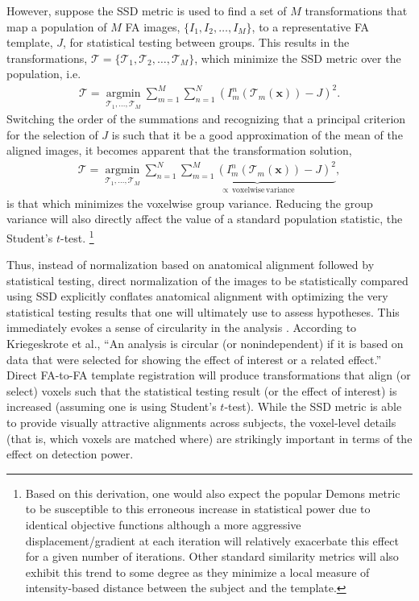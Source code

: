 \documentclass[final,5p,times,twocolumn]{elsarticle}
\begin{document}
However, suppose the SSD metric is used to find a set of $M$ transformations that map a population of $M$ FA images, $\{I_1, I_2, \ldots, I_M\}$, to a representative FA template, $J$, for statistical testing between groups. This results in the transformations,
$\boldsymbol{\mathcal{T}} = \{\mathcal{T}_1, \mathcal{T}_2,\ldots,\mathcal{T}_M \}$, which minimize the SSD metric over the population, i.e.
\begin{align}
  \boldsymbol{\mathcal{T}} = \underset{\mathcal{T}_1, \ldots, \mathcal{T}_M}{\operatorname{argmin}}
    \sum_{m=1}^M\sum_{n=1}^N \left( I^n_m( \mathcal{T}_m(\mathbf{x}) ) - J \right)^2.
\end{align}
Switching the order of the summations and recognizing that a principal criterion for the selection of $J$ is such that it be a good approximation of the mean of the aligned images, it becomes apparent that the transformation solution,
\begin{align}\label{eq:variance}
  \boldsymbol{\mathcal{T}} = \underset{\mathcal{T}_1, \ldots, \mathcal{T}_M}{\operatorname{argmin}}
    \sum_{n=1}^N \underbrace{\sum_{m=1}^M \left( I^n_m( \mathcal{T}_m(\mathbf{x}) ) - J \right)^2}_{
    \propto\mathrm{\,voxelwise\,variance}},
\end{align}
is that which minimizes the voxelwise group variance.  Reducing the group variance will also directly affect the value of a standard population statistic, the Student's $t$-test.%
\footnote{
Based on this derivation, one would also expect the popular Demons metric to be susceptible to this erroneous increase in statistical power due to identical objective functions although a more aggressive displacement/gradient at each iteration will relatively exacerbate this effect for a given number of iterations.  
Other standard similarity metrics will also exhibit this
trend to some degree as they minimize a local measure of intensity-based distance between the subject and the template.
}  

Thus, instead of normalization based on anatomical alignment followed by
statistical testing, direct normalization of the images to be statistically compared using SSD
explicitly conflates {\color{red}{attempts at}}
anatomical alignment with optimizing the very statistical testing
results that one will ultimately use to assess hypotheses.  This immediately evokes a sense of circularity in the analysis \citep{Kriegeskorte2010}.
According to Kriegeskrote et al., ``An analysis is circular (or nonindependent) if it is based on data that were selected for showing the effect of interest or a related effect.''  Direct FA-to-FA template registration will produce transformations that align (or select) voxels such that the statistical testing result (or the effect of interest) is increased (assuming one is using Student's 
$t$-test).  While the SSD metric is able to provide visually attractive alignments across subjects, the voxel-level details (that is, which voxels are matched where) are strikingly important in terms of the effect on detection power.  
\end{document}
